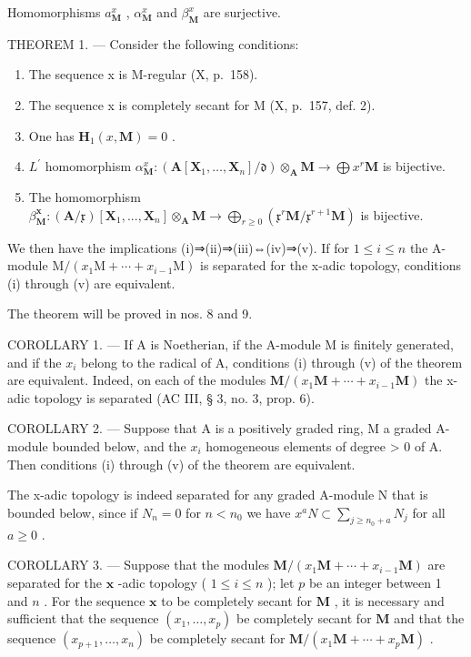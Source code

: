 Homomorphisms \(a_{\mathbf{M}}^{x}\) , \(\alpha_{\mathbf{M}}^{x}\) and \(\beta_{\mathbf{M}}^{x}\) are surjective.

THEOREM 1. --- Consider the following conditions:

\begin{enumerate}
\def\labelenumi{(\roman{enumi})}
\item
  The sequence x is M-regular (X, p.~158).
\item
  The sequence x is completely secant for M (X, p.~157, def. 2).
\item
  One has \(\mathbf{H}_1(x, \mathbf{M}) = 0\) .
\item
  \(L^{\prime}\) homomorphism \(\alpha_{\mathbf{M}}^{x}:(\mathbf{A}[\mathbf{X}_{1},\dots,\mathbf{X}_{n}]/\mathfrak{d})\otimes_{\mathbf{A}}\mathbf{M}\to\bigoplus x^{r}\mathbf{M}\) is bijective.
\item
  The homomorphism \(\beta_{\mathbf{M}}^{\mathbf{x}}:(\mathbf{A}/\mathfrak{x})[\mathbf{X}_{1},..., \mathbf{X}_{n}]\otimes_{\mathbf{A}}\mathbf{M}\to\bigoplus_{r\geqslant0}(\mathfrak{x}^{r}\mathbf{M}/\mathfrak{x}^{r+1}\mathbf{M})\) is bijective.
\end{enumerate}

We then have the implications (i)⇒(ii)⇒(iii)⇔(iv)⇒(v). If for \(1 \leqslant i \leqslant n\) the A-module \(\mathrm{M}/(x_{1}\mathrm{M} + \cdots + x_{i-1}\mathrm{M})\) is separated for the x-adic topology, conditions (i) through (v) are equivalent.

The theorem will be proved in nos. 8 and 9.

COROLLARY 1. --- If A is Noetherian, if the A-module M is finitely generated, and if the \(x_{i}\) belong to the radical of A, conditions (i) through (v) of the theorem are equivalent. Indeed, on each of the modules \(\mathbf{M}/(x_{1} \mathbf{M} + \cdots + x_{i-1} \mathbf{M})\) the x-adic topology is separated (AC III, § 3, no. 3, prop. 6).

COROLLARY 2. --- Suppose that A is a positively graded ring, M a graded A-module bounded below, and the \(x_i\) homogeneous elements of degree \textgreater{} 0 of A. Then conditions (i) through (v) of the theorem are equivalent.

The x-adic topology is indeed separated for any graded A-module N that is bounded below, since if \(N_{n}=0\) for \(n<n_{0}\) we have \(x^{a}N\subset\sum_{j\geqslant n_{0}+a}N_{j}\) for all \(a\geqslant0\) .

COROLLARY 3. --- Suppose that the modules \(\mathbf{M}/(x_1\mathbf{M} + \cdots + x_{i-1}\mathbf{M})\) are separated for the \(\mathbf{x}\) -adic topology ( \(1 \leqslant i \leqslant n\) ); let \(p\) be an integer between 1 and \(n\) . For the sequence \(\mathbf{x}\) to be completely secant for \(\mathbf{M}\) , it is necessary and sufficient that the sequence \((x_1, \ldots, x_p)\) be completely secant for \(\mathbf{M}\) and that the sequence \((x_{p+1}, \ldots, x_n)\) be completely secant for \(\mathbf{M}/(x_1\mathbf{M} + \cdots + x_p\mathbf{M})\) .


